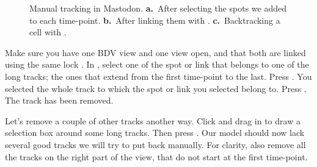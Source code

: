 \begin{figure}
    \hfill
    \hfill\null
    
    \caption{Manual tracking in Mastodon. \textbf{a.}~After selecting the spots we added to each time-point. \textbf{b.}~After linking them with . \textbf{c.}~Backtracking a cell with .  }
    \label{fig:ManualTracking}
\end{figure}  



Make sure you have one BDV view and one \TrackScheme view open, and that both are linked using the same lock .
In \TrackScheme, select one of the spot or link that belongs to one of the long tracks; the ones that extend from the first time-point to the last.
Press .
You selected the whole track to which the spot or link you selected belong to.
Press \keys{\shift+\backdel}.
The track has been removed.

Let's remove a couple of other tracks another way.
Click and drag in \TrackScheme to draw a selection box around some long tracks.
Then press \keys{\shift+\backdel}.
Our model should now lack several good tracks we will try to put back manually.
For clarity, also remove all the tracks on the right part of the \TrackScheme view, that do not start at the first time-point.

